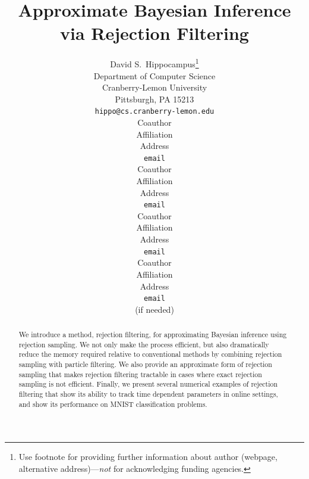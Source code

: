 \documentclass{article} %
\begin{document}


\title{Approximate Bayesian Inference via Rejection Filtering}
\author{
David S.~Hippocampus\thanks{ Use footnote for providing further information
about author (webpage, alternative address)---\emph{not} for acknowledging
funding agencies.} \\
Department of Computer Science\\
Cranberry-Lemon University\\
Pittsburgh, PA 15213 \\
\texttt{hippo@cs.cranberry-lemon.edu} \\
\And
Coauthor \\
Affiliation \\
Address \\
\texttt{email} \\
\AND
Coauthor \\
Affiliation \\
Address \\
\texttt{email} \\
\And
Coauthor \\
Affiliation \\
Address \\
\texttt{email} \\
\And
Coauthor \\
Affiliation \\
Address \\
\texttt{email} \\
(if needed)\\
}

\maketitle



\begin{abstract}
We introduce a method, rejection filtering, for approximating Bayesian inference
using rejection sampling.
We not only make the process efficient, but also dramatically
reduce the memory required relative to conventional methods
by combining rejection sampling with particle filtering.
We also provide an approximate form of rejection sampling that makes rejection filtering tractable
in cases where exact rejection sampling is not efficient.
Finally, we present several numerical examples of rejection filtering that show its ability to track
time dependent parameters in online settings, and show its performance on MNIST classification problems.
\end{abstract}
\end{document}
